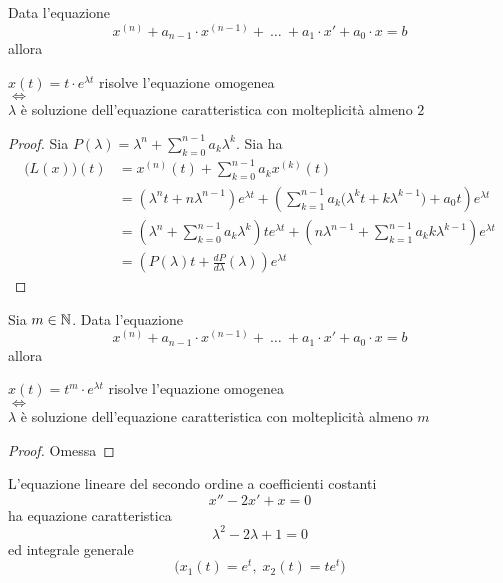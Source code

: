 \begin{proposition}
	Data l'equazione
	$$x^{(n)} + a_{n-1} \cdot x^{(n-1)} +\:\ldots\:+ a_1 \cdot x'+a_0 \cdot x = b$$
	allora
	\begin{center}
		$x(t)= t \cdot e^{\lambda t}$ risolve l'equazione omogenea\\
		$\iff$\\
		$\lambda$ è soluzione dell'equazione caratteristica con molteplicità almeno $2$
	\end{center}
	\begin{proof}
		Sia $P(\lambda) = \lambda^n + \sum\limits_{k=0}^{n-1} a_k \lambda^k$. Sia ha
		\begin{align*}
			\bigl( L(x) \bigr)(t) &= x^{(n)}(t) + \sum\limits_{k=0}^{n-1} a_k x^{(k)}(t)\\
			&= \left( \lambda^n t + n\lambda^{n-1} \right) e^{\lambda t} + \left( \sum\limits_{k=1}^{n-1} a_k \bigl( \lambda^k t + k \lambda^{k-1} \bigr) + a_0 t \right) e^{\lambda t}\\
			&= \left( \lambda^n + \sum\limits_{k=0}^{n-1} a_k \lambda^k \right) t e^{\lambda t} + \left( n \lambda^{n-1} + \sum\limits_{k=1}^{n-1} a_k k \lambda^{k-1} \right) e^{\lambda t}\\
			&= \left( P(\lambda)t + \frac{dP}{d\lambda}(\lambda) \right) e^{\lambda t}
		\end{align*}
	\end{proof}
\end{proposition}
\begin{proposition}
	Sia $m \in \mathbb{N}$. Data l'equazione
	$$x^{(n)} + a_{n-1} \cdot x^{(n-1)} +\:\ldots\:+ a_1 \cdot x'+a_0 \cdot x = b$$
	allora
	\begin{center}
		$x(t)= t^m \cdot e^{\lambda t}$ risolve l'equazione omogenea\\
		$\iff$\\
		$\lambda$ è soluzione dell'equazione caratteristica con molteplicità almeno $m$
	\end{center}
	\begin{proof}
		Omessa
	\end{proof}
\end{proposition}
\begin{example}
	L'equazione lineare del secondo ordine a coefficienti costanti
	$$x'' -2x' +x = 0$$
	ha equazione caratteristica
	$$\lambda^2 - 2\lambda + 1 = 0$$
	ed integrale generale
	$$\bigl( x_1(t) = e^t,\;x_2(t) = t e^t \bigr)$$
\end{example}
\color{black}

